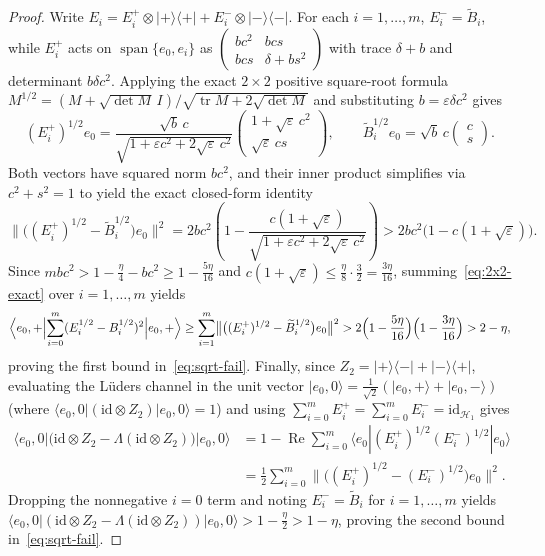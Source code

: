 \documentclass[11pt,a4paper]{article}
\theoremstyle{definition}
\theoremstyle{remark}
\newcommand{\HH}{\mathcal{H}}
\newcommand{\id}{\mathrm{id}}
\newcommand{\tr}{\operatorname{tr}}
\newcommand{\ket}[1]{|#1\rangle}
\newcommand{\bra}[1]{\langle #1|}
\newcommand{\braket}[2]{\langle #1 | #2 \rangle}
\begin{document}
\begin{proof}
Write $E_i = E_i^+\otimes\ket{+}\bra{+} + E_i^-\otimes\ket{-}\bra{-}$. For each $i=1,\dots,m$, $E_i^- = \widetilde{B}_i$, while $E_i^+$ acts on $\operatorname{span}\{e_0,e_i\}$ as $\begin{pmatrix} bc^2 & bcs \\ bcs & \delta+bs^2\end{pmatrix}$ with trace $\delta+b$ and determinant $b\delta c^2$. Applying the exact $2\times 2$ positive square-root formula $M^{1/2} = (M + \sqrt{\det M}\,I)/\sqrt{\tr M + 2\sqrt{\det M}}$ and substituting $b = \varepsilon\delta c^2$ gives
\[
(E_i^+)^{1/2} e_0 = \frac{\sqrt{b}\,c}{\sqrt{1 + \varepsilon c^2 + 2\sqrt{\varepsilon}\,c^2}}\begin{pmatrix} 1 + \sqrt{\varepsilon}\,c^2 \\ \sqrt{\varepsilon}\,cs \end{pmatrix},
\qquad
\widetilde{B}_i^{1/2} e_0 = \sqrt{b}\,c\begin{pmatrix} c \\ s \end{pmatrix}.
\]
Both vectors have squared norm $bc^2$, and their inner product simplifies via $c^2 + s^2 = 1$ to yield the exact closed-form identity
\begin{equation}\label{eq:2x2-exact}
\bigl\|\bigl((E_i^+)^{1/2} - \widetilde{B}_i^{1/2}\bigr)e_0\bigr\|^2
= 2 b c^2\left(1 - \frac{c(1 + \sqrt{\varepsilon})}{\sqrt{1 + \varepsilon c^2 + 2\sqrt{\varepsilon}\,c^2}}\right)
> 2 b c^2\bigl(1 - c(1 + \sqrt{\varepsilon})\bigr).
\end{equation}
Since $m b c^2 > 1 - \frac{\eta}{4} - b c^2 \ge 1 - \frac{5\eta}{16}$ and $c(1+\sqrt{\varepsilon}) \le \frac{\eta}{8}\cdot\frac{3}{2} = \frac{3\eta}{16}$, summing~\eqref{eq:2x2-exact} over $i=1,\dots,m$ yields
\[
\Bigl\langle e_0,+\Bigl|\sum_{i=0}^m (E_i^{1/2}-B_i^{1/2})^2\Bigr|e_0,+\Bigr\rangle
\ge \sum_{i=1}^m \bigl\|\bigl((E_i^+)^{1/2} - \widetilde{B}_i^{1/2}\bigr)e_0\bigr\|^2
> 2\Bigl(1 - \frac{5\eta}{16}\Bigr)\Bigl(1 - \frac{3\eta}{16}\Bigr) > 2 - \eta,
\]
proving the first bound in~\eqref{eq:sqrt-fail}. Finally, since $Z_2 = \ket{+}\bra{-} + \ket{-}\bra{+}$, evaluating the L\"uders channel in the unit vector $\ket{e_0,0} = \frac{1}{\sqrt{2}}(\ket{e_0,+}+\ket{e_0,-})$ (where $\braket{e_0,0}{(\id\otimes Z_2)|e_0,0} = 1$) and using $\sum_{i=0}^m E_i^+ = \sum_{i=0}^m E_i^- = \id_{\HH_1}$ gives
\begin{align*}
\bra{e_0,0}\bigl(\id\otimes Z_2 - \Lambda(\id\otimes Z_2)\bigr)\ket{e_0,0}
&= 1 - \operatorname{Re}\sum_{i=0}^m \bra{e_0}(E_i^+)^{1/2}(E_i^-)^{1/2}\ket{e_0} \\
&= \frac{1}{2}\sum_{i=0}^m \bigl\|\bigl((E_i^+)^{1/2}-(E_i^-)^{1/2}\bigr)e_0\bigr\|^2.
\end{align*}
Dropping the nonnegative $i=0$ term and noting $E_i^- = \widetilde{B}_i$ for $i=1,\dots,m$ yields $\bra{e_0,0}(\id\otimes Z_2 - \Lambda(\id\otimes Z_2))\ket{e_0,0} > 1 - \frac{\eta}{2} > 1 - \eta$, proving the second bound in~\eqref{eq:sqrt-fail}.
\end{proof}
\end{document}
